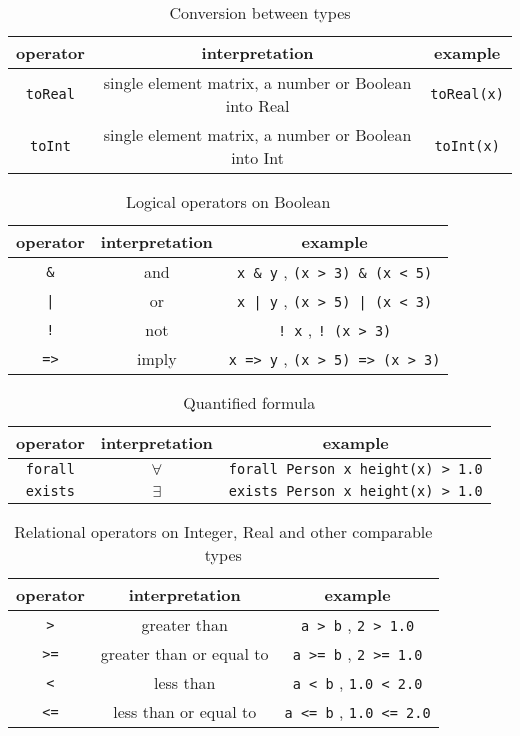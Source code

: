 \documentclass[12pt]{article}
\begin{document}
\begin{table}[H]
\centering
\caption{Conversion between types
\label{tab:conversion}
}
\begin{tabular}{ c c c }
\toprule 
operator & interpretation & example \\
\midrule
\verb|toReal| & single element matrix, a number or Boolean into Real & \verb|toReal(x)| \\
\verb|toInt| & single element matrix, a number or Boolean into Int & \verb|toInt(x)| \\
\bottomrule
\end{tabular}
\end{table}



\begin{table}[H]
\centering
\caption{Logical operators on Boolean}
\begin{tabular}{ c c c }
\toprule 
operator & interpretation & example \\
\midrule
\verb|&| & and & \verb|x & y| , \verb|(x > 3) & (x < 5)| \\ 
{\tt |} & or & \verb#x | y# , \verb#(x > 5) | (x < 3)# \\ 
{\tt !} & not & \verb|! x| , \verb|! (x > 3)| \\
{\tt =>} & imply & \verb|x => y| , \verb|(x > 5) => (x > 3)| \\
\bottomrule
\end{tabular}
\end{table}

\begin{table}[H]
\centering
\caption{Quantified formula}
\begin{tabular}{ c c c }
\toprule 
operator & interpretation & example \\
\midrule
{\tt forall} & $\forall$ & \verb|forall Person x height(x) > 1.0| \\ 
{\tt exists} & $\exists$ & \verb|exists Person x height(x) > 1.0|  \\ 
\bottomrule
\end{tabular}
\end{table}

\begin{table}[H]
\centering
\caption{Relational operators on Integer, Real and other comparable types}
\begin{tabular}{ c c c }
\toprule 
operator & interpretation & example \\
\midrule
{\tt >} & greater than & \verb|a > b| ,  \verb|2 > 1.0|\\ 
{\tt >=} & greater than or equal to & \verb|a >= b| ,  \verb|2 >= 1.0| \\ 
{\tt <} & less than & \verb|a < b| ,  \verb|1.0 < 2.0| \\
{\tt <=} & less than or equal to & \verb|a <= b| ,  \verb|1.0 <= 2.0|  \\
\bottomrule
\end{tabular}
\end{table}
\end{document}
